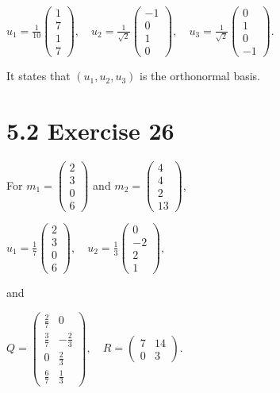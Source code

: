 \(u_{1} = \frac{1}{10}\begin{pmatrix}
1 \\
7 \\
1 \\
7
\end{pmatrix},\quad u_{2} = \frac{1}{\sqrt{2}}\begin{pmatrix}
{- 1} \\
0 \\
1 \\
0
\end{pmatrix},\quad u_{3} = \frac{1}{\sqrt{2}}\begin{pmatrix}
0 \\
1 \\
0 \\
{- 1}
\end{pmatrix}.\)

It states that \(\left( {u_{1},u_{2},u_{3}} \right)\) is the orthonormal basis.

\section{5.2 Exercise 26}

For \(m_{1} = \begin{pmatrix}
2 \\
3 \\
0 \\
6
\end{pmatrix}\) and \(m_{2} = \begin{pmatrix}
4 \\
4 \\
2 \\
13
\end{pmatrix}\),

\(u_{1} = \frac{1}{7}\begin{pmatrix}
2 \\
3 \\
0 \\
6
\end{pmatrix},\quad u_{2} = \frac{1}{3}\begin{pmatrix}
0 \\
{- 2} \\
2 \\
1
\end{pmatrix},\)

and

\(Q = \begin{pmatrix}
\frac{2}{7} & 0 \\
\frac{3}{7} & {- \frac{2}{3}} \\
0 & \frac{2}{3} \\
\frac{6}{7} & \frac{1}{3}
\end{pmatrix},\quad R = \begin{pmatrix}
7 & 14 \\
0 & 3
\end{pmatrix}.\)

